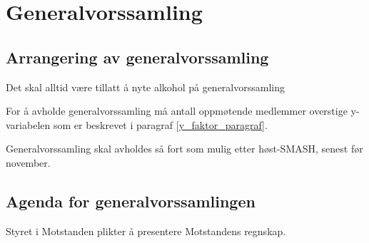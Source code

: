   
\section{Generalvorssamling}
    \subsection{Arrangering av generalvorssamling}
        \begin{statute}
            Det skal alltid være tillatt å nyte alkohol på generalvorssamling
        \end{statute}
        \begin{statute} 
            For å avholde generalvorssamling må antall oppmøtende medlemmer overstige y-variabelen som er beskrevet i paragraf \ref{y_faktor_paragraf}.
        \end{statute}
        \begin{statute}
            Generalvorssamling skal avholdes så fort som mulig etter høst-SMASH, senest før november.
        \end{statute}
    
    \subsection{Agenda for generalvorssamlingen}
        \begin{statute}
            Styret i Motstanden plikter å presentere Motstandens regnskap. 
        \end{statute}

